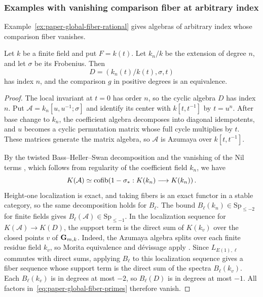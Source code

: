 \subsubsection{Examples with vanishing comparison fiber at arbitrary index}
Example~\ref{ex:paper-global-fiber-rational} gives algebras of arbitrary index whose comparison fiber vanishes.

\begin{example}\label{ex:paper-global-fiber-rational}
Let $k$ be a finite field and put $F=k(t)$.
Let $k_n/k$ be the extension of degree $n$, and let $\sigma$ be its Frobenius.
Then
\[
 D=(k_n(t)/k(t),\sigma,t)
\]
has index $n$, and the comparison $g$ in positive degrees is an equivalence.
\end{example}
\begin{proof}
The local invariant at $t=0$ has order $n$, so the cyclic algebra $D$ has index $n$.
Put $\mathcal A=k_n[u,u^{-1};\sigma]$ and identify its center with $k[t,t^{-1}]$ by $t=u^n$.
After base change to $k_n$, the coefficient algebra decomposes into diagonal idempotents, and $u$ becomes a cyclic permutation matrix whose full cycle multiplies by $t$.
These matrices generate the matrix algebra, so $\mathcal A$ is Azumaya over $k[t,t^{-1}]$.

By the twisted Bass--Heller--Swan decomposition \cite[Corollary 5.3]{KirsteinKremer} and the vanishing of the Nil terms \cite[Corollary 4.2]{KirsteinKremer}, which follows from regularity of the coefficient field $k_n$, we have
\[
 K(\mathcal A)\simeq\operatorname{cofib}\!\left(1-\sigma_*:K(k_n)\longrightarrow K(k_n)\right).
\]
Height-one localization is exact, and taking fibers is an exact functor in a stable category, so the same decomposition holds for $B_\ell$.
The bound $B_\ell(k_n)\in\mathrm{Sp}_{\le-2}$ for finite fields \cite[Theorem 6.18]{ClausenMathew} gives $B_\ell(\mathcal A)\in\mathrm{Sp}_{\le-1}$.
In the localization sequence for $K(\mathcal A)\to K(D)$, the support term is the direct sum of $K(k_v)$ over the closed points $v$ of $\mathbf G_{m,k}$.
Indeed, the Azumaya algebra splits over each finite residue field $k_v$, so Morita equivalence and d\'evissage apply \cite[\S5]{QuillenHigher}.
Since $L_{E(1),\ell}$ commutes with direct sums, applying $B_\ell$ to this localization sequence gives a fiber sequence whose support term is the direct sum of the spectra $B_\ell(k_v)$.
Each $B_\ell(k_v)$ is in degrees at most $-2$, so $B_\ell(D)$ is in degrees at most $-1$.
All factors in~\eqref{eq:paper-global-fiber-primes} therefore vanish.
\end{proof}

